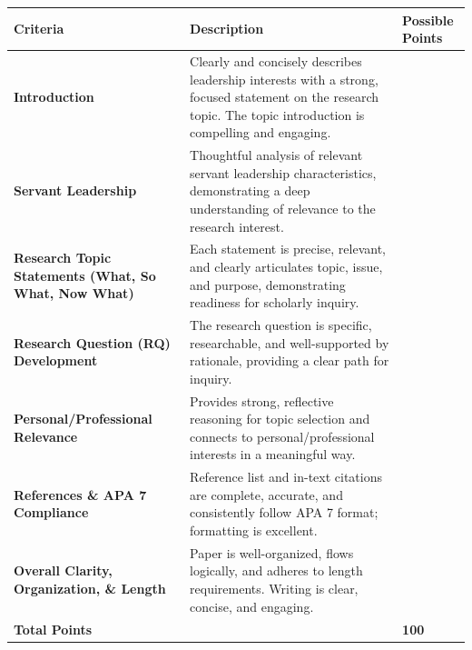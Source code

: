 \documentclass[
  letterpaper,
  DIV=11,
  numbers=noendperiod]{scrreprt}
\begin{document}
\begin{longtable}[]{@{}
  >{\raggedright\arraybackslash}p{}
  >{\raggedright\arraybackslash}p{}
  >{\raggedright\arraybackslash}p{}@{}}
\toprule\noalign{}
\begin{minipage}[b]{\linewidth}\raggedright
\textbf{Criteria}
\end{minipage} & \begin{minipage}[b]{\linewidth}\raggedright
\textbf{Description}
\end{minipage} & \begin{minipage}[b]{\linewidth}\raggedright
\textbf{Possible Points}
\end{minipage} \\
\midrule\noalign{}
\endhead
\bottomrule\noalign{}
\endlastfoot
\textbf{Introduction} & Clearly and concisely describes leadership
interests with a strong, focused statement on the research topic. The
topic introduction is compelling and engaging. & 15 \\
\textbf{Servant Leadership} & Thoughtful analysis of relevant servant
leadership characteristics, demonstrating a deep understanding of
relevance to the research interest. & 20 \\
\textbf{Research Topic Statements (What, So What, Now What)} & Each
statement is precise, relevant, and clearly articulates topic, issue,
and purpose, demonstrating readiness for scholarly inquiry. & 20 \\
\textbf{Research Question (RQ) Development} & The research question is
specific, researchable, and well-supported by rationale, providing a
clear path for inquiry. & 20 \\
\textbf{Personal/Professional Relevance} & Provides strong, reflective
reasoning for topic selection and connects to personal/professional
interests in a meaningful way. & 10 \\
\textbf{References \& APA 7 Compliance} & Reference list and in-text
citations are complete, accurate, and consistently follow APA 7 format;
formatting is excellent. & 10 \\
\textbf{Overall Clarity, Organization, \& Length} & Paper is
well-organized, flows logically, and adheres to length requirements.
Writing is clear, concise, and engaging. & 5 \\
\textbf{Total Points} & & \textbf{100} \\
\end{longtable}
\end{document}
